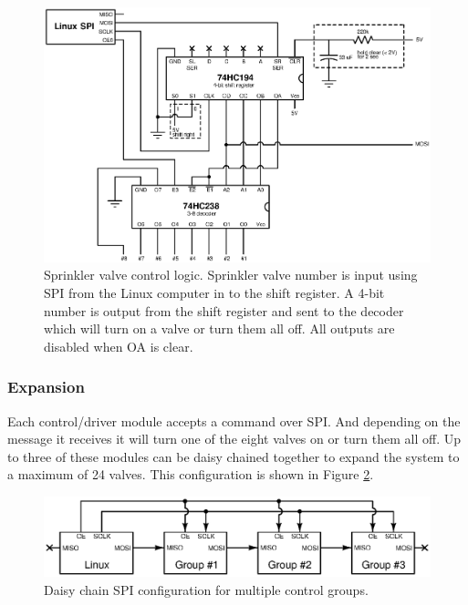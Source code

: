 \documentclass{article}
\begin{document}
\begin{figure}[hbp]
\includegraphics[scale=0.85]{xcircuit/control}
\caption{Sprinkler valve control logic.
Sprinkler valve number is input using SPI from the Linux computer in
to the shift register.
A 4-bit number is output from the shift register and sent to the
decoder which will turn on a valve or turn them all off.
All outputs are disabled when OA is clear.}\label{fig:control}
\end{figure}


\clearpage
\subsubsection{Expansion}
\label{sec:expansion}

Each control/driver module accepts a command over SPI.
And depending on the message it receives it will turn one of the
eight valves on or turn them all off.
Up to three of these modules can be daisy chained together
to expand the system to a maximum of 24 valves.
This configuration is shown in Figure \ref{fig:expansion_spi}.

\begin{figure}[hbp]
\centering
\includegraphics[angle=0,scale=0.80]{xcircuit/expansion_spi}
\caption{Daisy chain SPI configuration for multiple control groups.
}\label{fig:expansion_spi}
\end{figure}
\end{document}
